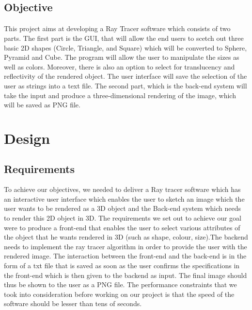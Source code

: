 \documentclass{article}
\begin{document}
\subsection{Objective}

\paragraph{}
This project aims at developing a Ray Tracer software which consists of two parts. \newline The first part is the GUI, that will allow the end users to scetch out three basic 2D shapes (Circle, Triangle, and Square) which will be converted to Sphere, Pyramid and Cube.  The program will allow the user to manipulate the sizes as well as colors. Moreover, there is also an option to select for translucency and reflectivity of the rendered object. The user interface will save the selection of the user as strings into a text file.
\newline The second part, which is the back-end system will take the input and produce  a three-dimensional rendering of the image, which will be saved as PNG file. 


\section{Design}

\subsection{Requirements}
To achieve our objectives, we needed to deliver a Ray tracer software which has  an interactive user interface which enables the user to sketch an image which the user wants to be rendered as a 3D object and the Back-end system which needs to render this 2D object in 3D. The requirements we set out to achieve our goal were to produce a front-end that enables the user to select various attributes of the object that he wants rendered in 3D (such as shape, colour, size).The backend needs to implement the ray tracer algorithm in order to provide the user with the rendered image. The interaction between the front-end and the back-end is in the form of a txt file that is saved as soon as the user confirms the specifications in the front-end which is then given to the backend as input. The final image should thus be shown to the user as a PNG file. The performance constraints that we took into consideration before working on our project is that the speed of the software should be lesser than tens of seconds. 
\end{document}
